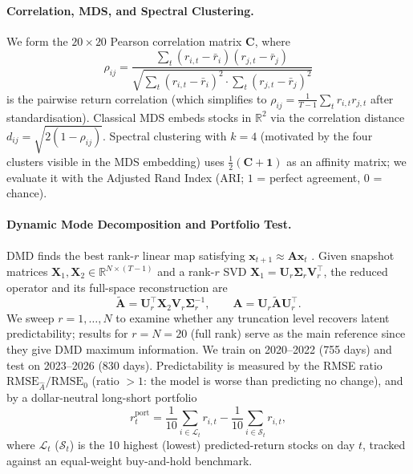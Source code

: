 \documentclass[runningheads]{llncs}
\begin{document}
\paragraph{Correlation, MDS, and Spectral Clustering.}
We form the $20\times20$ Pearson correlation matrix $\mathbf{C}$, where
\begin{equation}
  \rho_{ij} = \frac{\sum_{t}(r_{i,t}-\bar r_i)(r_{j,t}-\bar r_j)}
    {\sqrt{\sum_t(r_{i,t}-\bar r_i)^2\cdot\sum_t(r_{j,t}-\bar r_j)^2}}
  \label{eq:pearson}
\end{equation}
is the pairwise return correlation (which simplifies to
$\rho_{ij}=\tfrac{1}{T-1}\sum_t r_{i,t}r_{j,t}$ after standardisation).
Classical MDS \citep{kutz2016dynamic} embeds stocks in $\mathbb{R}^2$ via the
correlation distance $d_{ij}=\sqrt{2(1-\rho_{ij})}$.
Spectral clustering \citep{luxburg2007tutorial} with $k=4$ (motivated by the
four clusters visible in the MDS embedding) uses $\tfrac{1}{2}(\mathbf{C}+\mathbf{1})$
as an affinity matrix; we evaluate it with the Adjusted Rand Index
(ARI; $1$ = perfect agreement, $0$ = chance).

\paragraph{Dynamic Mode Decomposition and Portfolio Test.}
DMD finds the best rank-$r$ linear map satisfying
$\mathbf{x}_{t+1}\approx\mathbf{A}\mathbf{x}_t$ \citep{kutz2016dynamic}.
Given snapshot matrices $\mathbf{X}_1,\mathbf{X}_2\!\in\!\mathbb{R}^{N\times(T-1)}$
and a rank-$r$ SVD $\mathbf{X}_1=\mathbf{U}_r\boldsymbol{\Sigma}_r\mathbf{V}_r^\top$,
the reduced operator and its full-space reconstruction are
\begin{equation}
  \tilde{\mathbf{A}}=\mathbf{U}_r^\top\mathbf{X}_2\mathbf{V}_r\boldsymbol{\Sigma}_r^{-1},
  \qquad
  \mathbf{A}=\mathbf{U}_r\tilde{\mathbf{A}}\mathbf{U}_r^\top.
  \label{eq:dmd}
\end{equation}
We sweep $r=1,\ldots,N$ to examine whether any truncation level recovers
latent predictability; results for $r=N=20$ (full rank) serve as the main
reference since they give DMD maximum information.
We train on 2020--2022 (755 days) and test on 2023--2026 (830 days).
Predictability is measured by the RMSE ratio $\mathrm{RMSE}_{\hat A}/\mathrm{RMSE}_{0}$
(ratio $>1$: the model is worse than predicting no change), and by a
dollar-neutral long-short portfolio
\begin{equation}
  r_t^{\text{port}} = \frac{1}{10}\!\sum_{i\in\mathcal{L}_t}\!r_{i,t}
    - \frac{1}{10}\!\sum_{i\in\mathcal{S}_t}\!r_{i,t},
  \label{eq:portfolio}
\end{equation}
where $\mathcal{L}_t$ ($\mathcal{S}_t$) is the 10 highest (lowest) predicted-return
stocks on day $t$, tracked against an equal-weight buy-and-hold benchmark.
\end{document}
